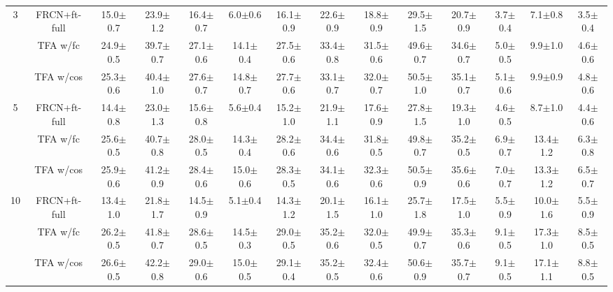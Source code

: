 \documentclass{article}
\newcommand{\model}{TFA\xspace}
\begin{document}
\begin{table*}[ht]
{\begin{tabular}{c|c|cccccc|ccc|ccc}
\multirow{3}{*}{3} & FRCN+ft-full & 15.0$\pm$0.7 & 23.9$\pm$1.2 & 16.4$\pm$0.7 & 6.0$\pm$0.6 & 16.1$\pm$0.9 & 22.6$\pm$0.9 & 18.8$\pm$0.9 & 29.5$\pm$1.5 & 20.7$\pm$0.9 & 3.7$\pm$0.4 & 7.1$\pm$0.8 & 3.5$\pm$0.4 \\
 & {\model w/fc} & 24.9$\pm$0.5 & 39.7$\pm$0.7 & 27.1$\pm$0.6 & 14.1$\pm$0.4 & 27.5$\pm$0.6 & 33.4$\pm$0.8 & 31.5$\pm$0.6 & 49.6$\pm$0.7 & 34.6$\pm$0.7 & 5.0$\pm$0.5 & 9.9$\pm$1.0 & 4.6$\pm$0.6 \\
 & {\cellcolor{Gray} \model w/cos} & \cellcolor{Gray}25.3$\pm$0.6 & \cellcolor{Gray}40.4$\pm$1.0 & \cellcolor{Gray}27.6$\pm$0.7 & \cellcolor{Gray}14.8$\pm$0.7 & \cellcolor{Gray}27.7$\pm$0.6 & \cellcolor{Gray}33.1$\pm$0.7 & \cellcolor{Gray}32.0$\pm$0.7 & \cellcolor{Gray}50.5$\pm$1.0 & \cellcolor{Gray}35.1$\pm$0.7 & \cellcolor{Gray}5.1$\pm$0.6 & \cellcolor{Gray}9.9$\pm$0.9 & \cellcolor{Gray}4.8$\pm$0.6 \\ \midrule
\multirow{3}{*}{5} & FRCN+ft-full & 14.4$\pm$0.8 & 23.0$\pm$1.3 & 15.6$\pm$0.8 & 5.6$\pm$0.4 & 15.2$\pm$1.0 & 21.9$\pm$1.1 & 17.6$\pm$0.9 & 27.8$\pm$1.5 & 19.3$\pm$1.0 & 4.6$\pm$0.5 & 8.7$\pm$1.0 & 4.4$\pm$0.6 \\
 & {\model w/fc} & 25.6$\pm$0.5 & 40.7$\pm$0.8 & 28.0$\pm$0.5 & 14.3$\pm$0.4 & 28.2$\pm$0.6 & 34.4$\pm$0.6 & 31.8$\pm$0.5 & 49.8$\pm$0.7 & 35.2$\pm$0.5 & 6.9$\pm$0.7 & 13.4$\pm$1.2 & 6.3$\pm$0.8 \\
 & {\cellcolor{Gray} \model w/cos} & \cellcolor{Gray}25.9$\pm$0.6 & \cellcolor{Gray}41.2$\pm$0.9 & \cellcolor{Gray}28.4$\pm$0.6 & \cellcolor{Gray}15.0$\pm$0.6 & \cellcolor{Gray}28.3$\pm$0.5 & \cellcolor{Gray}34.1$\pm$0.6 & \cellcolor{Gray}32.3$\pm$0.6 & \cellcolor{Gray}50.5$\pm$0.9 & \cellcolor{Gray}35.6$\pm$0.6 & \cellcolor{Gray}7.0$\pm$0.7 & \cellcolor{Gray}13.3$\pm$1.2 & \cellcolor{Gray}6.5$\pm$0.7 \\ \midrule
\multirow{3}{*}{10} & FRCN+ft-full & 13.4$\pm$1.0 & 21.8$\pm$1.7 & 14.5$\pm$0.9 & 5.1$\pm$0.4 & 14.3$\pm$1.2 & 20.1$\pm$1.5 & 16.1$\pm$1.0 & 25.7$\pm$1.8 & 17.5$\pm$1.0 & 5.5$\pm$0.9 & 10.0$\pm$1.6 & 5.5$\pm$0.9 \\
 & {\model w/fc} & 26.2$\pm$0.5 & 41.8$\pm$0.7 & 28.6$\pm$0.5 & 14.5$\pm$0.3 & 29.0$\pm$0.5 & 35.2$\pm$0.6 & 32.0$\pm$0.5 & 49.9$\pm$0.7 & 35.3$\pm$0.6 & 9.1$\pm$0.5 & 17.3$\pm$1.0 & 8.5$\pm$0.5 \\
 & {\cellcolor{Gray} \model w/cos} & \cellcolor{Gray}26.6$\pm$0.5 & \cellcolor{Gray}42.2$\pm$0.8 & \cellcolor{Gray}29.0$\pm$0.6 & \cellcolor{Gray}15.0$\pm$0.5 & \cellcolor{Gray}29.1$\pm$0.4 & \cellcolor{Gray}35.2$\pm$0.5 & \cellcolor{Gray}32.4$\pm$0.6 & \cellcolor{Gray}50.6$\pm$0.9 & \cellcolor{Gray}35.7$\pm$0.7 & \cellcolor{Gray}9.1$\pm$0.5 & \cellcolor{Gray}17.1$\pm$1.1 & \cellcolor{Gray}8.8$\pm$0.5 \\ \midrule

\end{tabular}}
\end{table*}
\end{document}
